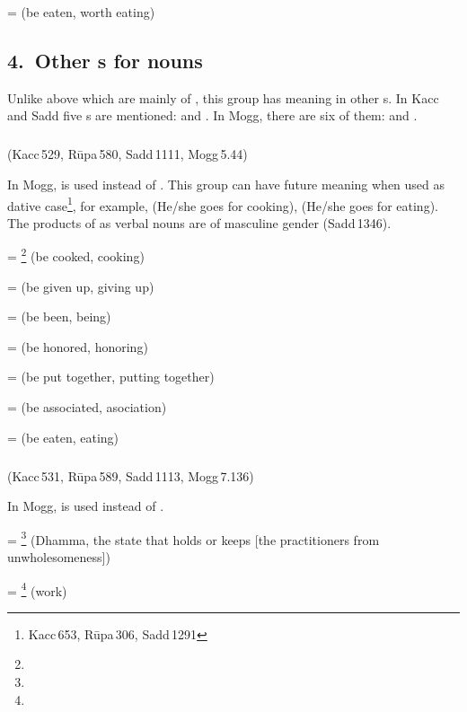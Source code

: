  =  (be eaten, worth eating)\par

\subsection*{4.\ Other s for nouns}\label{kita:group4}

Unlike above which are mainly of , this group has meaning in other s. In Kacc and Sadd five s are mentioned:  and . In Mogg, there are six of them:  and .

\subparagraph*{} (Kacc\,529, R\=upa\,580, Sadd\,1111, Mogg\,5.44)\label{pacck4:dna}\label{pacck4:ghadna}

In Mogg,  is used instead of . This group can have future meaning when used as dative case\footnote{Kacc\,653, R\=upa\,306, Sadd\,1291}, for example,  (He/she goes for cooking),  (He/she goes for eating). The products of  as verbal nouns are of masculine gender (Sadd\,1346).

 = \footnote{} (be cooked, cooking)\par
{} =  (be given up, giving up)\par
{} =  (be been, being)\par
{} =  (be honored, honoring)\par
{} =  (be put together, putting together)\par
{} =  (be associated, asociation)\par
{} =  (be eaten, eating)\par

\subparagraph*{} (Kacc\,531, R\=upa\,589, Sadd\,1113, Mogg\,7.136)\label{pacck4:ramma}\label{pacck4:ma}

In Mogg,  is used instead of .

 = \footnote{} (Dhamma, the state that holds or keeps [the practitioners from unwholesomeness])\par
{} = \footnote{} (work)\par

